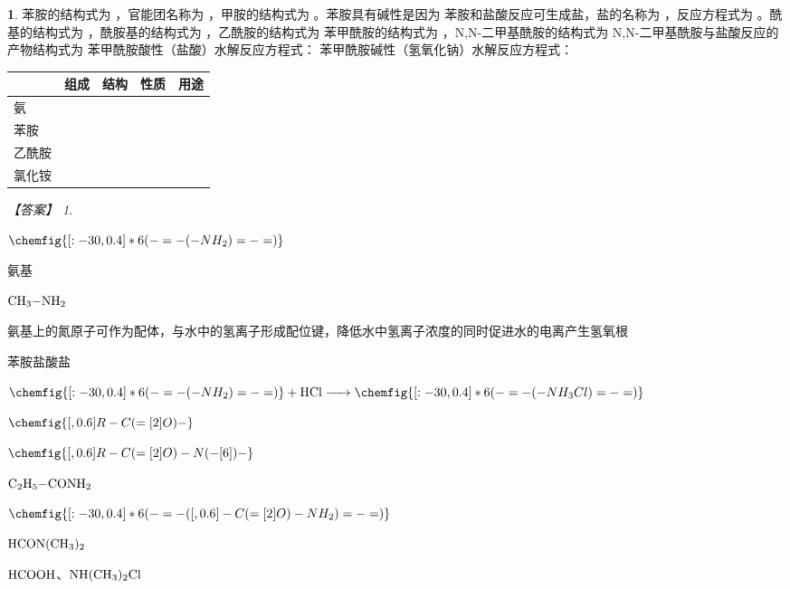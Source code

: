 \documentclass[UTF8, 10pt, a4paper, oneside]{ctexart}
\newcommand{\blank}{ \underbar{\quad$\blacktriangle$\quad} }%
\theoremstyle{definition}
\newtheorem{subexercise}{}[exercise]%
\theoremstyle{remark}
\newtheorem*{answer}{【答案】}
\theoremstyle{plain}
\begin{document}
\begin{subexercise}
    苯胺的结构式为\blank ，官能团名称为\blank ，甲胺的结构式为\blank 。苯胺具有碱性是因为\blank 苯胺和盐酸反应可生成盐，盐的名称为\blank ，反应方程式为\blank 。酰基的结构式为\blank ，酰胺基的结构式为\blank ，乙酰胺的结构式为\blank 苯甲酰胺的结构式为\blank ，N,N-二甲基酰胺的结构式为\blank N,N-二甲基酰胺与盐酸反应的产物结构式为\blank 苯甲酰胺酸性（盐酸）水解反应方程式：\blank 苯甲酰胺碱性（氢氧化钠）水解反应方程式：\blank
    \begin{table}[!ht]
        \centering
        \begin{tabular}{|l|l|l|l|l|}
            \hline
            ~   & 组成     & 结构     & 性质     & 用途     \\ \hline
            氨   & \blank & \blank & \blank & \blank \\ \hline
            苯胺  & \blank & \blank & \blank & \blank \\ \hline
            乙酰胺 & \blank & \blank & \blank & \blank \\ \hline
            氯化铵 & \blank & \blank & \blank & \blank \\ \hline
        \end{tabular}
    \end{table}
    \begin{answer}
        \begin{inparaenum}
            \item[\setcounter{enumi}{1}\textsuperscript{\arabic{enumi}}] $\chemfig{[:-30,0.4] *6(-=-(-NH_2)=-=)}$
            \item 氨基
            \item $\ce{CH3-NH2}$
            \item 氨基上的氮原子可作为配体，与水中的氢离子形成配位键，降低水中氢离子浓度的同时促进水的电离产生氢氧根
            \item 苯胺盐酸盐
            \item $\chemfig{[:-30,0.4] *6(-=-(-NH_2)=-=)}\ce{+ HCl -> }\chemfig{[:-30,0.4] *6(-=-(-NH_3Cl)=-=)}$
            \item $\chemfig{[,0.6] R-C(=[2]O)-}$
            \item $\chemfig{[,0.6] R-C(=[2]O)-N(-[6])-}$
            \item $\ce{C2H5-CONH2}$
            \item $\chemfig{[:-30,0.4] *6(-=-([,0.6]-C(=[2]O)-NH_2)=-=)}$
            \item $\ce{HCON(CH3)2}$
            \item $\ce{HCOOH}$、$\ce{NH(CH3)2Cl}$\\

\end{inparaenum}
\end{answer}
\end{subexercise}
\end{document}
